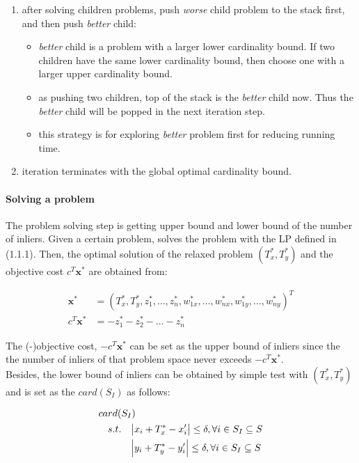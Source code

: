 \documentclass[paper=a4, fontsize=11pt]{scrartcl} %
\numberwithin{equation}{section} %
\numberwithin{figure}{section} %
\numberwithin{table}{section} %
\renewcommand{\vec}[1]{\mathbf{#1}}
\begin{document}
\begin{enumerate}
\begin{itemize}
	\end{itemize}
\item after solving children problems, push \textit{worse} child problem to the stack first, and then push \textit{better} child:
	\begin{itemize}
	\item \textit{better} child is a problem with a larger lower cardinality bound. If two children have the same lower cardinality bound, then choose one with a larger upper cardinality bound.
	\item as pushing two children, top of the stack is the \textit{better} child now. Thus the \textit{better} child will be popped in the next iteration step. 
	\item this strategy is for exploring \textit{better} problem first for reducing running time. 
	\end{itemize}
\item iteration terminates with the global optimal cardinality bound. 
\end{enumerate}

\paragraph{Solving a problem} The problem solving step is getting upper bound and lower bound of the number of inliers. Given a certain problem, solves the problem with the LP defined in (1.1.1). Then, the optimal solution of the relaxed problem $(T_{x}^*, T_{y}^*)$ and the objective cost $c^{T}\vec{x}^*$ are obtained from:

\begin{align}
\vec{x}^* &= (T_{x}^*, T_{y}^*, z_{1}^*, \dots, z_{n}^*, w_{1x}^*, \dots, w_{nx}^*, w_{1y}^*, \dots, w_{ny}^*)^{T} \\
c^{T} \vec{x}^* &= - z_{1}^* - z_{2}^* - \dots - z_{n}^*
\end{align}

The (-)objective cost, $-c^{T}\vec{x}^*$ can be set as the upper bound of inliers since the the number of inliers of that problem space never exceeds  $-c^{T}\vec{x}^*$. \\

Besides, the lower bound of inliers can be obtained by simple test with $(T_{x}^*, T_{y}^*)$ and is set as the $card(S_{I})$ as follows:

\begin{equation}
\begin{split}
card(&S_{I})  \\
s.t. 	&\quad \abs{x_{i} + T_{x}^* - x_{i}'} \leq \delta, \forall i \in S_{I} \subseteq S \\
	&\quad \abs{y_{i} + T_{y}^* - y_{i}'} \leq \delta, \forall i \in S_{I} \subseteq S
\end{split}
\end{equation}
\end{document}
